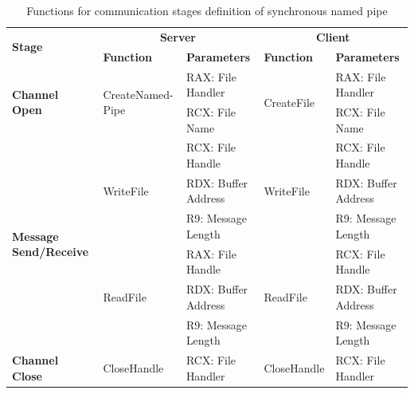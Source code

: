     \begin{table}[h]
        \centering
        \caption{Functions for communication stages definition of synchronous named pipe}
        \label{synfunctions}
        \begin{tabular}{|l|l|l|l|l|}
            \hline
             \multirow{2}{*}{\textbf{Stage}} &
               \multicolumn{2}{c|}{\textbf{Server}} &
               \multicolumn{2}{c|}{\textbf{Client}} \\
             \cline{2-5}
              & \textbf{Function}& \textbf{Parameters} & \textbf{Function} & \textbf{Parameters}  \\
             \hline
             \multirow{2}{*}{\parbox{1.8cm}{\textbf{Channel Open}}}
             &\multirow{2}{*}{\parbox{2.5cm}{CreateNamed- Pipe}} &  RAX: File Handler & \multirow{2}{*}{CreateFile} &  RAX: File Handler\\
              \cline{3-3} \cline{5-5}
             &&  RCX: File Name &  &  RCX: File Name\\
            \hline
             \multirow{6}{*}{\parbox{1.8cm}{\textbf{Message Send/Receive}}}
             &\multirow{3}{*}{WriteFile} &  RCX: File Handle & \multirow{3}{*}{WriteFile} &  RCX: File Handle\\
              \cline{3-3} \cline{5-5}
             &&  RDX: Buffer Address &  &  RDX: Buffer Address\\
                           \cline{3-3} \cline{5-5}
             & &  R9: Message Length &  &  R9: Message Length\\
            \cline{2-5}
             & \multirow{3}{*}{ReadFile}&  RAX: File Handle & \multirow{3}{*}{ReadFile} &  RCX: File Handle\\
              \cline{3-3} \cline{5-5}
              &&  RDX: Buffer Address &  &  RDX: Buffer Address\\
                           \cline{3-3} \cline{5-5}
             & &  R9: Message Length &  &  R9: Message Length\\
            \hline
            \textbf{Channel Close} & CloseHandle &  RCX: File Handler & CloseHandle &  RCX: File Handler\\
            \hline
        \end{tabular}
    \end{table}

